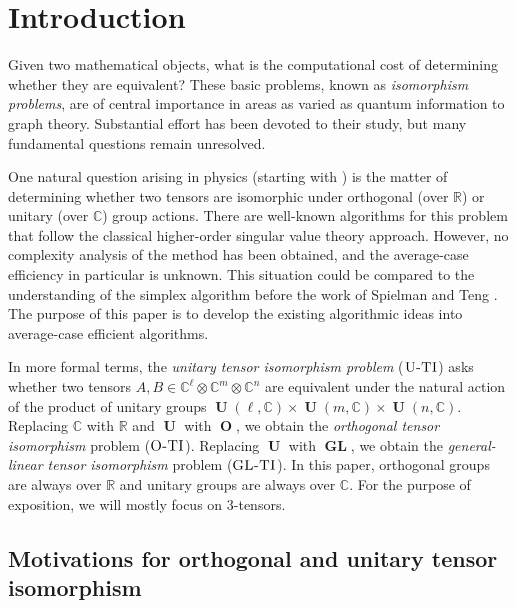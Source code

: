 \documentclass[11pt]{article}
\numberwithin{equation}{section}
\theoremstyle{remark}
\DeclareMathOperator{\Orth}{\textbf{O}}
\DeclareMathOperator{\GL}{\textbf{GL}}
\DeclareMathOperator{\Unitary}{\textbf{U}}
\newcommand{\CC}{\mathbb{C}}
\newcommand{\RR}{\mathbb{R}}
\newcommand{\OTI}{\textsc{O-TI}}
\newcommand{\UTI}{\textsc{U-TI}}
\newcommand{\GLTI}{\textsc{GL-TI}}
\begin{document}
\newpage

\tableofcontents

\newpage


\section{Introduction}

Given two mathematical objects, what is the computational cost of determining whether they are equivalent? These basic problems, known as \textit{isomorphism problems}, are of central importance in areas as varied as quantum information to graph theory. Substantial effort has been devoted to their study, but many fundamental questions remain unresolved.

One natural question arising in physics (starting with \cite{kraus2010local,LLLQ12}) is the matter of determining whether two tensors are isomorphic under orthogonal (over $\RR$) or unitary (over $\CC$) group actions. There are well-known algorithms for this problem that follow the classical higher-order singular value theory approach. However, no complexity analysis of the method has been obtained, and the average-case efficiency in particular is unknown. This situation could be compared to the understanding of the simplex algorithm before the work of Spielman and Teng \cite{spielman2004smoothed}.
The purpose of this paper is to develop the existing algorithmic ideas into average-case efficient algorithms.

In more formal terms, the \emph{unitary tensor isomorphism problem} ($\UTI$) asks whether two tensors $A, B \in \CC^{\ell} \otimes \CC^m \otimes \CC^n$ are equivalent under the natural action of the product of unitary groups $\Unitary(\ell, \CC)\times \Unitary(m, \CC)\times \Unitary(n, \CC)$. Replacing $\CC$ with $\RR$ and $\Unitary$ with $\Orth$, we obtain the \emph{orthogonal tensor isomorphism} problem ($\OTI$). Replacing $\Unitary$ with $\GL$, we obtain the \emph{general-linear tensor isomorphism} problem ($\GLTI$). In this paper, orthogonal groups are always over $\RR$ and unitary groups are always over $\CC$. For the purpose of exposition, we will mostly focus on $3$-tensors. 

\subsection{Motivations for orthogonal and unitary tensor isomorphism}\label{subsec:motivation}
\end{document}
